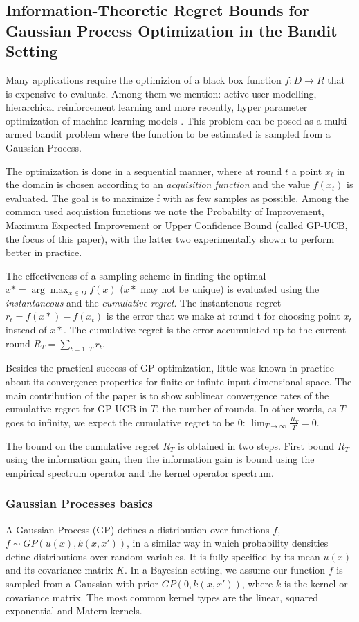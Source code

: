 \documentclass[10pt,journal,a4paper]{IEEEtran}
\begin{document}
\subsection{Information-Theoretic Regret Bounds for Gaussian Process Optimization in the Bandit Setting}

Many applications require the optimizion of a black box function $f: D\to R$ that is expensive to evaluate. Among them we mention: active user modelling, hierarchical reinforcement learning\cite{BPtutorial} and more recently, hyper parameter optimization of machine learning models \cite{hyperparameter}. This problem can be posed as a multi-armed bandit problem where the function to be estimated is sampled from a Gaussian Process.

The optimization is done in a sequential manner, where at round $t$ a point $x_t$ in the domain is chosen according to an \textit{acquisition function} and the value $f(x_t)$ is evaluated. The goal is to maximize f with as few samples as possible. Among the common used acquistion functions we note the Probabilty of Improvement, Maximum Expected Improvement or Upper Confidence Bound (called GP-UCB, the focus of this paper), with the latter two experimentally shown to perform better in practice. 

The effectiveness of a sampling scheme in finding the optimal $x* = \arg\max_{x\in D}f(x)$ ($x*$  may not be unique) is evaluated using the \textit{instantaneous} and the 
\textit{cumulative regret}.  The instantenous regret $r_t = f(x*) - f(x_t)$ is the error that we make at round t for choosing point $x_t$ instead of $x*$. The cumulative regret is the error accumulated up to the current round $R_T = \sum_{t=1..T} r_t$.

Besides the practical success of GP optimization, little was known in practice about its convergence properties for finite or infinte input dimensional space. The main contribution of the paper is to show sublinear convergence rates of the cumulative regret for GP-UCB in $T$, the number of rounds. In other words, as $T$ goes to infinity, we expect the cumulative regret to be 0: $\lim_{T\to\infty} \frac{R_T}{T} = 0$.

The bound on the cumulative regret $R_T$ is obtained in two steps. First bound $R_T$ using the information gain, then the information gain is bound using the empirical spectrum operator and the kernel operator spectrum.

\subsubsection{Gaussian Processes basics}
A Gaussian Process (GP) defines a distribution over functions $f$, $f \sim GP(u(x), k(x,x'))$, in a similar way in which probability densities define distributions over random variables. It is fully specified by its mean $u(x)$ and its covariance matrix $K$. In a Bayesian setting, we assume our function $f$ is sampled from a Gaussian with prior $GP(0, k(x,x'))$, where $k$ is the kernel or covariance matrix. The most common kernel types are the linear, squared exponential and Matern kernels.
\end{document}

